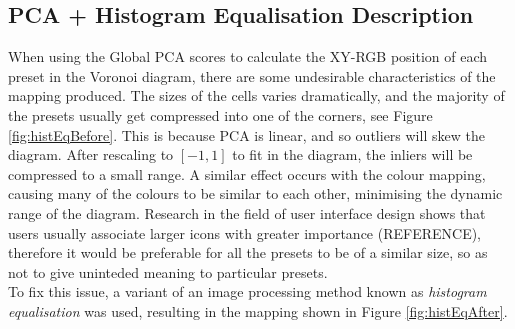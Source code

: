 \documentclass[11pt, oneside]{report}   	%
\begin{document}
\subsection{PCA + Histogram Equalisation Description}
When using the Global PCA scores to calculate the XY-RGB position of each preset in the Voronoi diagram, there are some undesirable characteristics of the mapping produced. The sizes of the cells varies dramatically, and the majority of the presets usually get compressed into one of the corners, see Figure \ref{fig:histEqBefore}. This is because PCA is linear, and so outliers will skew the diagram. After rescaling to $[-1, 1]$ to fit in the diagram, the inliers will be compressed to a small range. A similar effect occurs with the colour mapping, causing many of the colours to be similar to each other, minimising the dynamic range of the diagram. Research in the field of user interface design shows that users usually associate larger icons with greater importance (REFERENCE), therefore it would be preferable for all the presets to be of a similar size, so as not to give uninteded meaning to particular presets.\\
To fix this issue, a variant of an image processing method known as \emph{histogram equalisation}\cite{HistogramEqualisation} was used, resulting in the mapping shown in Figure \ref{fig:histEqAfter}.
\end{document}
